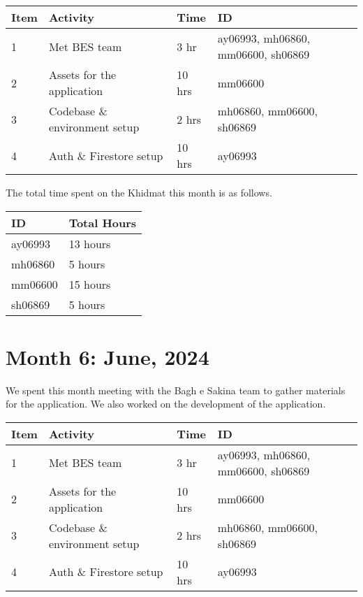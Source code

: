 \documentclass{article}
\begin{document}
\begin{tabular}{|l|l|l|l|}
  \hline
  Item & Activity                      & Time   & ID                                 \\\hline\hline
  1    & Met BES team                  & 3 hr   & ay06993, mh06860, mm06600, sh06869 \\\hline
  2    & Assets for the application    & 10 hrs & mm06600                            \\\hline
  3    & Codebase \& environment setup & 2 hrs  & mh06860, mm06600, sh06869          \\\hline
  4    & Auth \& Firestore setup       & 10 hrs & ay06993                            \\\hline
\end{tabular}

The total time spent on the Khidmat this month is as follows.

\begin{tabular}{|l|l|}
  \hline
  ID      & Total Hours \\\hline\hline
  ay06993 & 13 hours    \\\hline
  mh06860 & 5 hours    \\\hline
  mm06600 & 15 hours     \\\hline
  sh06869 & 5 hours    \\\hline
\end{tabular}

\newpage %
\section*{Month 6: June, 2024}

We spent this month meeting with the Bagh e Sakina team to gather materials for
the application. We also worked on the development of the application.

\begin{tabular}{|l|l|l|l|}
  \hline
  Item & Activity                      & Time   & ID                                 \\\hline\hline
  1    & Met BES team                  & 3 hr   & ay06993, mh06860, mm06600, sh06869 \\\hline
  2    & Assets for the application    & 10 hrs & mm06600                            \\\hline
  3    & Codebase \& environment setup & 2 hrs  & mh06860, mm06600, sh06869          \\\hline
  4    & Auth \& Firestore setup       & 10 hrs & ay06993                            \\\hline
\end{tabular}
\end{document}
